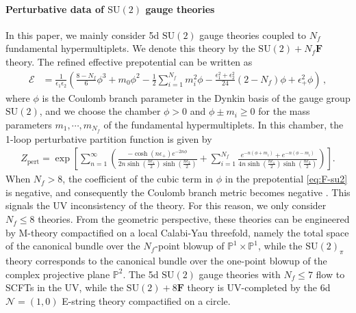 \documentclass[11pt, a4paper]{article}
\theoremstyle{definition}
\begin{document}
\paragraph{Perturbative data of $ \mathrm{SU}(2) $ gauge theories}

In this paper, we mainly consider 5d $ \mathrm{SU}(2) $ gauge theories coupled to $ N_f $ fundamental hypermultiplets. We denote this theory by the $ \mathrm{SU}(2)+N_f\mathbf{F} $ theory. The refined effective prepotential can be written as
\begin{align}\label{eq:F-su2}
    \mathcal{E} &= \frac{1}{\epsilon_1 \epsilon_2} \left( \frac{8-N_f}{6}\phi^3 + m_0\phi^2  - \frac{1}{2} \sum_{i=1}^{N_f} m_i^2 \phi  - \frac{\epsilon_1^2 + \epsilon_2^2}{24} (2-N_f) \phi + \epsilon_+^2 \phi \right) \, ,
\end{align}
where $ \phi $ is the Coulomb branch parameter in the Dynkin basis of the gauge group $ \mathrm{SU}(2) $, and we choose the chamber $ \phi>0 $ and $ \phi \pm m_i \geq 0 $ for the mass parameters $ m_1, \cdots, m_{N_f} $ of the fundamental hypermultiplets. In this chamber, the 1-loop perturbative partition function is given by
\begin{align} \label{eq:su2-pert}
    Z_{\mathrm{pert}} = \exp\left[ \sum_{n=1}^\infty \left( \frac{-\cosh(n\epsilon_+) e^{-2n\phi}}{2n\sinh(\frac{n\epsilon_1}{2}) \sinh(\frac{n \epsilon_2}{2})} + \sum_{i=1}^{N_f} \frac{e^{-n(\phi+m_i)} + e^{-n(\phi-m_i)}}{4n\sinh(\frac{n\epsilon_1}{2}) \sinh(\frac{n \epsilon_2}{2})} \right) \right] .
\end{align}
When $ N_f>8 $, the coefficient of the cubic term in $ \phi $ in the prepotential \eqref{eq:F-su2} is negative, and consequently the Coulomb branch metric becomes negative \cite{Seiberg:1996bd}. This signals the UV inconsistency of the theory. For this reason, we only consider $ N_f \leq 8 $ theories. From the geometric perspective, these theories can be engineered by M-theory compactified on a local Calabi-Yau threefold, namely the total space of the canonical bundle over the $ N_f $-point blowup of $ \mathbb{P}^1 \times \mathbb{P}^1 $, while the $ \mathrm{SU}(2)_\pi $ theory corresponds to the canonical bundle over the one-point blowup of the complex projective plane $ \mathbb{P}^2 $. The 5d $ \mathrm{SU}(2) $ gauge theories with $ N_f \leq 7 $ flow to SCFTs in the UV, while the $ \mathrm{SU}(2)+8\mathbf{F} $ theory is UV-completed by the 6d $ \mathcal{N}=(1,0) $ E-string theory compactified on a circle.
\end{document}
